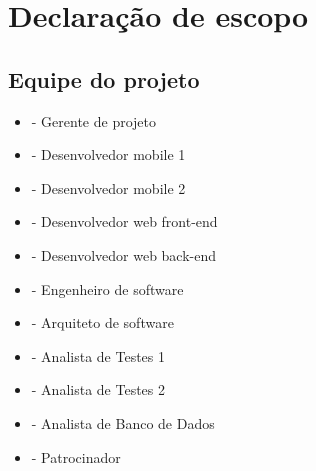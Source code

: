 
\chapter{Declaração de escopo}

\section{Equipe do projeto}

\begin{itemize}
	\item \projectManagerName{} - Gerente de projeto
	\item \mobDevOneName{} - Desenvolvedor mobile 1
	\item \mobDevTwoName{} - Desenvolvedor mobile 2
	\item \frontWebDevName{} - Desenvolvedor web front-end
	\item \backWebDevName{} - Desenvolvedor web back-end
	\item \softEngName{} - Engenheiro de software
	\item \softArcName{} - Arquiteto de software
	\item \testAnalOneName{} - Analista de Testes 1
	\item \testAnalTwoName{} - Analista de Testes 2
	\item \dbAnalName{} - Analista de Banco de Dados 
	\item \projectSponsorName{} - Patrocinador
\end{itemize}


